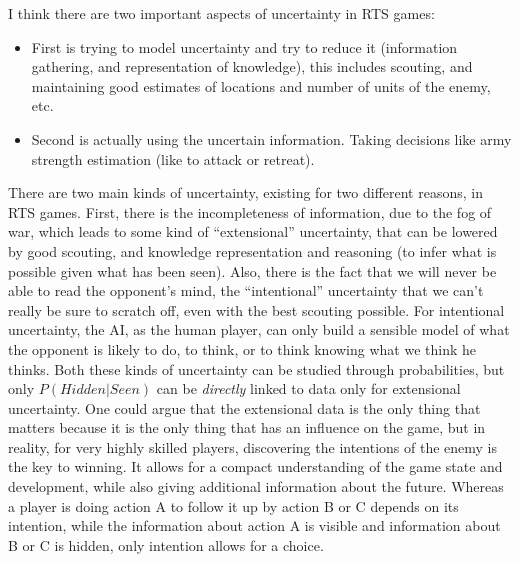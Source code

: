 \documentclass[journal]{IEEEtran}
\begin{document}
{\color{blue}
I think there are two important aspects of uncertainty in RTS games:
\begin{itemize}
\item First is trying to model uncertainty and try to reduce it (information gathering, and representation of knowledge), this includes scouting, and maintaining good estimates of locations and number of units of the enemy, etc.
\item Second is actually using the uncertain information. Taking decisions like army strength estimation (like to attack or retreat).
\end{itemize}

There are two main kinds of uncertainty, existing for two different reasons, in RTS games. First, there is the incompleteness of information, due to the fog of war, which leads to some kind of ``extensional'' 
uncertainty, that can be lowered by good scouting, and knowledge representation and reasoning (to infer what is possible given what has been seen). Also, there is the fact that we will never be able to read the opponent's mind, the ``intentional'' 
uncertainty that we can't really be sure to scratch off, even with the best scouting possible. For intentional uncertainty, the AI, as the human player, can only build a sensible model of what the opponent is likely to do, to think, or to think knowing what we think he thinks. Both these kinds of uncertainty can be studied through probabilities, but only $P(Hidden | Seen)$ can be \textit{directly} linked to data only for extensional uncertainty. %
One could argue that the extensional data is the only thing that matters because it is the only thing that has an influence on the game, but in reality, for very highly skilled players, discovering the intentions of the enemy is the key to winning. It allows for a compact understanding of the game state and development, while also giving additional information about the future. Whereas a player is doing action A to follow it up by action B or C depends on its intention, while the information about action A is visible and information about B or C is hidden, only intention allows for a choice.
}
\end{document}
